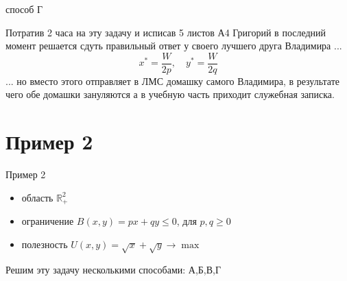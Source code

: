 \documentclass{beamer}
\begin{document}
\begin{frame}{способ Г}

Потратив 2 часа на эту задачу и исписав 5 листов А4 Григорий в последний момент решается сдуть правильный ответ у своего лучшего друга Владимира ...
$$ x^* = \frac{W}{2p}, \quad y^* = \frac{W}{2q}$$
... но вместо этого отправляет в ЛМС домашку самого Владимира, в результате чего обе домашки зануляются а в учебную часть приходит служебная записка.

\end{frame}

\section{Пример 2}

\begin{frame}{Пример 2}

\begin{itemize}
  \item область $\mathbb{R}^2_{+}$
  \item ограничение $B(x,y) = p x + q y \leqslant 0$, для $p,q \geqslant 0$
  \item полезность $U(x,y) = \sqrt{x} + \sqrt{y} \to \max$
\end{itemize}

Решим эту задачу несколькими способами: А,Б,В,Г

\end{frame}
\end{document}
